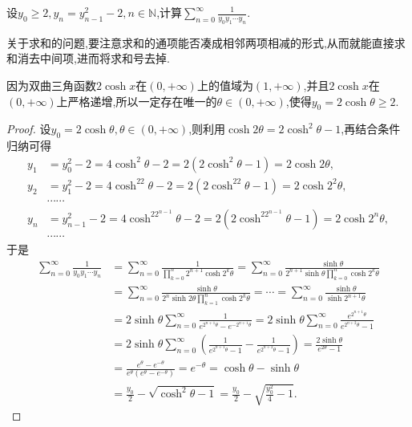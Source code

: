 \documentclass[../../main.tex]{subfiles}%
\begin{document}
\begin{example}\label{example:三角换元求通项例题11111}
设\(y_0\geqslant 2,y_n=y_{n - 1}^{2}-2,n\in\mathbb{N}\),计算\(\sum_{n = 0}^{\infty}\frac{1}{y_0y_1\cdots y_n}\).
\end{example}
\begin{note}
关于求和的问题,要注意求和的通项能否凑成相邻两项相减的形式,从而就能直接求和消去中间项,进而将求和号去掉.
\end{note}
\begin{remark}
因为双曲三角函数\(2\cosh x\)在\((0, +\infty)\)上的值域为\((1, +\infty)\),并且\(2\cosh x\)在\((0, +\infty)\)上严格递增,所以一定存在唯一的\(\theta \in (0, +\infty)\),使得\(y_0 = 2\cosh\theta \geqslant  2\).
\end{remark}
\begin{proof}
设\(y_0 = 2\cosh\theta, \theta \in (0, +\infty)\),则利用\(\cosh 2\theta = 2\cosh^2\theta - 1\),再结合条件归纳可得
\begin{align*}
y_1&=y_{0}^{2}-2 = 4\cosh^2\theta - 2 = 2(2\cosh^2\theta - 1) = 2\cosh 2\theta,\\
y_2&=y_{1}^{2}-2 = 4\cosh^22\theta - 2 = 2(2\cosh^22\theta - 1) = 2\cosh 2^2\theta,\\
&\cdots\cdots\\
y_n&=y_{n - 1}^{2}-2 = 4\cosh^22^{n - 1}\theta - 2 = 2(2\cosh^22^{n - 1}\theta - 1) = 2\cosh 2^n\theta,\\
&\cdots\cdots
\end{align*}
于是
\begin{align*}
\sum_{n=0}^{\infty}{\frac{1}{y_0y_1\cdots y_n}}&=\sum_{n=0}^{\infty}{\frac{1}{\prod\limits_{k=0}^n{2^{n+1}\cosh 2^k\theta}}}=\sum_{n=0}^{\infty}{\frac{\sinh \theta}{2^{n+1}\sinh \theta \prod\limits_{k=0}^n{\cosh 2^k\theta}}}
\\
&=\sum_{n=0}^{\infty}{\frac{\sinh \theta}{2^n\sinh 2\theta \prod\limits_{k=1}^n{\cosh 2^k\theta}}}=\cdots =\sum_{n=0}^{\infty}{\frac{\sinh \theta}{\sinh 2^{n+1}\theta}}
\\
&=2\sinh \theta \sum_{n=0}^{\infty}{\frac{1}{e^{2^{n+1}\theta}-e^{-2^{n+1}\theta}}}=2\sinh \theta \sum_{n=0}^{\infty}{\frac{e^{2^{n+1}\theta}}{e^{2^{n+2}\theta}-1}}
\\
&=2\sinh \theta \sum_{n=0}^{\infty}{\left( \frac{1}{e^{2^{n+1}\theta}-1}-\frac{1}{e^{2^{n+2}\theta}-1} \right)}=\frac{2\sinh \theta}{e^{2\theta}-1}
\\
&=\frac{e^{\theta}-e^{-\theta}}{e^{\theta}\left( e^{\theta}-e^{-\theta} \right)}=e^{-\theta}=\cosh \theta -\sinh \theta 
\\
&=\frac{y_0}{2}-\sqrt{\cosh ^2\theta -1}=\frac{y_0}{2}-\sqrt{\frac{y_{0}^{2}}{4}-1}.
\end{align*}
\end{proof}
\end{document}
